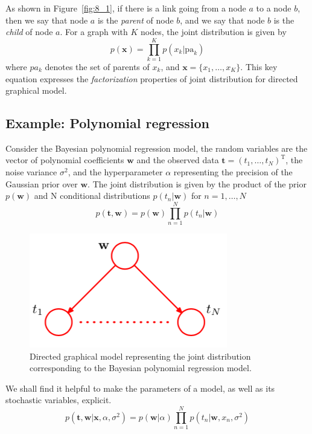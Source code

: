 \documentclass[5p,sort&compress]{elsarticle}
\begin{document}
As shown in Figure~\ref{fig:8_1}, if there is a link going from a node $a$ to a node $b$, then we say that node $a$ is the \textit{parent} of node $b$, and we say that node $b$ is the \textit{child} of node $a$. For a graph with $K$ nodes, the joint distribution is given by
\begin{equation}
p(\mathbf{x})=\prod_{k=1}^{K} p\left(x_{k} | \mathrm{pa}_{k}\right)
\end{equation}
where $pa_k$ denotes the set of parents of $x_k$, and $\mathbf{x} = \{x_1, \ldots, x_K\}$. This key equation expresses the \textit{factorization} properties of joint distribution for directed graphical model.


\subsection{Example: Polynomial regression}

Consider the Bayesian polynomial regression model, the random variables are the vector of polynomial coefficients $\mathbf{w}$ and the observed data $\mathbf{t} = (t_1, \ldots, t_N)^{\mathrm{T}}$, the noise variance $\sigma^2$, and the hyperparameter $\alpha$ representing the precision of the Gaussian prior over $\mathbf{w}$. The joint distribution is given by the product of the prior $p(\mathbf{w})$ and N conditional distributions $p(t_n|\mathbf{w})$ for $n = 1, \ldots, N$
\begin{equation}
p(\mathbf{t}, \mathbf{w})=p(\mathbf{w}) \prod_{n=1}^{N} p\left(t_{n} | \mathbf{w}\right)
\end{equation}

\begin{figure}[ht]
     \centering
     \includegraphics[width = 0.5\linewidth]{figure/figure8_3.png}
     \caption{Directed graphical model representing the joint distribution corresponding to the Bayesian polynomial regression model.}
     \label{fig:8_3}
\end{figure}

We shall find it helpful to make the parameters of a model, as well as its stochastic variables, explicit.
\begin{equation}
p\left(\mathbf{t}, \mathbf{w} | \mathbf{x}, \alpha, \sigma^{2}\right)=p(\mathbf{w} | \alpha) \prod_{n=1}^{N} p\left(t_{n} | \mathbf{w}, x_{n}, \sigma^{2}\right)
\end{equation}
\end{document}
